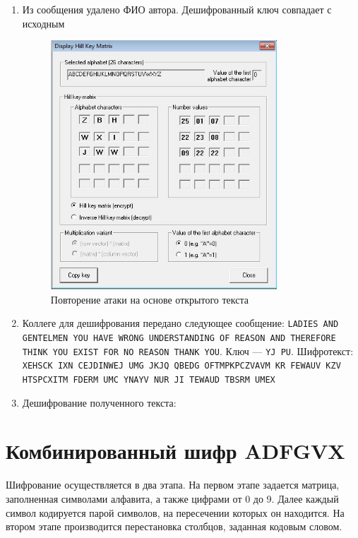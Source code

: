 \documentclass[a4paper, 14pt]{extarticle}
\begin{document}
\begin{enumerate}
    \item Из сообщения удалено ФИО автора. Дешифрованный ключ совпадает с исходным 
    \begin{figure}[h]
        \centering
        \includegraphics[width=0.8\textwidth]{./img/S005.jpg}
        \caption{Повторение атаки на основе открытого текста}%
        \label{img:1:4}
    \end{figure}
    
    \item Коллеге для дешифрования передано следующее сообщение: \texttt{LADIES AND GENTELMEN YOU HAVE WRONG UNDERSTANDING OF REASON AND THEREFORE THINK YOU EXIST FOR NO REASON THANK YOU}. Ключ --- \texttt{YJ PU}.
    Шифротекст: \texttt{XEHSCK IXN CEJDINWEJ UMG JKJQ QBEDG OFTMPKPCZVAVM KR FEWAUV KZV HTSPCXITM FDERM UMC YNAYV NUR JI TEWAUD TBSRM UMEX} 

    \item Дешифрование полученного текста:

    \lipsum[1] %

\end{enumerate}

\FloatBarrier{}
\section{Комбинированный шифр ADFGVX}
Шифрование осуществляется в два этапа. На первом этапе задается матрица, заполненная символами алфавита, а также цифрами от 0 до 9. Далее каждый символ кодируется парой символов, на пересечении которых он находится. На втором этапе производится перестановка столбцов, заданная кодовым словом.
\end{document}
